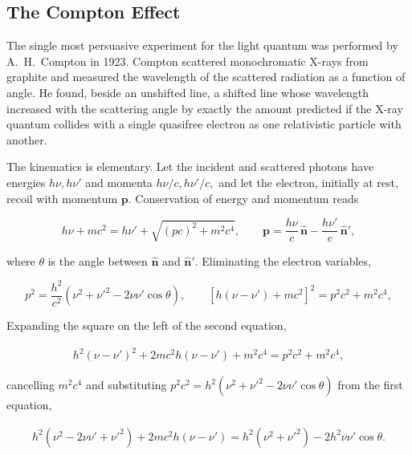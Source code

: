 \subsection{The Compton Effect}
The single most persuasive experiment for the light quantum was performed by A.~H.~Compton in 1923. Compton scattered monochromatic X-rays from graphite and measured the wavelength of the scattered radiation as a function of angle. He found, beside an unshifted line, a shifted line whose wavelength increased with the scattering angle by exactly the amount predicted if the X-ray quantum collides with a single quasifree electron as one relativistic particle with another.

The kinematics is elementary. Let the incident and scattered photons have energies $h\nu,h\nu'$ and momenta $h\nu/c,h\nu'/c,$ and let the electron, initially at rest, recoil with momentum $\bm p.$ Conservation of energy and momentum reads
\begin{linenomath}
    \begin{equation}
        h\nu+mc^2=h\nu'+\sqrt{(pc)^2+m^2c^4},
        \qquad
        \bm p=\frac{h\nu}{c}\,\hat{\bm n}-\frac{h\nu'}{c}\,\hat{\bm n}',
    \end{equation}
\end{linenomath}
where $\theta$ is the angle between $\hat{\bm n}$ and $\hat{\bm n}'.$ Eliminating the electron variables,
\begin{linenomath}
    \begin{equation}
        p^2=\frac{h^2}{c^2}\left(\nu^2+\nu'^2-2\nu\nu'\cos\theta\right),
        \qquad
        \left[h(\nu-\nu')+mc^2\right]^2=p^2c^2+m^2c^4,
    \end{equation}
\end{linenomath}
Expanding the square on the left of the second equation,
\begin{linenomath}
    \begin{align}
        h^{2}(\nu-\nu')^{2}+2mc^{2}h(\nu-\nu')+m^{2}c^{4}=p^{2}c^{2}+m^{2}c^{4},
    \end{align}
\end{linenomath}
cancelling $m^{2}c^{4}$ and substituting $p^{2}c^{2}=h^{2}(\nu^{2}+\nu'^{2}-2\nu\nu'\cos\theta)$ from the first equation,
\begin{linenomath}
    \begin{align}
        h^{2}(\nu^{2}-2\nu\nu'+\nu'^{2})+2mc^{2}h(\nu-\nu')
        =h^{2}(\nu^{2}+\nu'^{2})-2h^{2}\nu\nu'\cos\theta.
    \end{align}
\end{linenomath}
